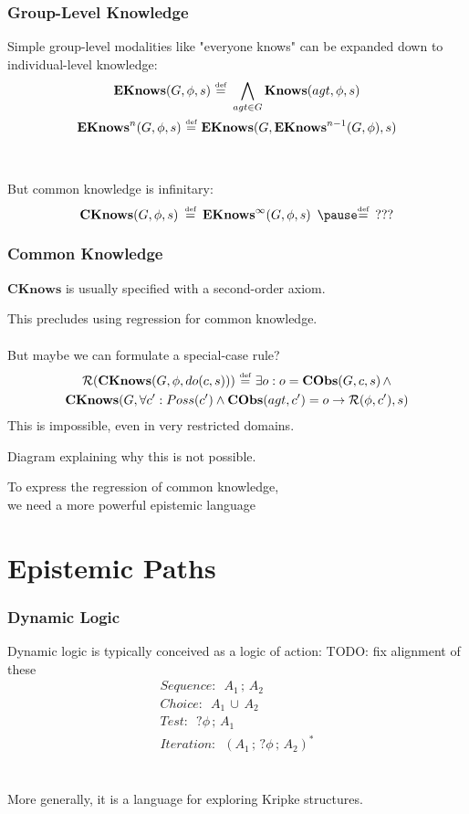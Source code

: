 \documentclass[compress]{beamer}
\newcommand{\isdef}{\hbox{$\stackrel{\mbox{\tiny def}}{=}$}}
\newcommand{\Reg}{\mathcal{R}}
\newcommand{\EKnows}{\mathbf{EKnows}}
\newcommand{\Knows}{\mathbf{Knows}}
\newcommand{\CKnows}{\mathbf{CKnows}}
\begin{document}
\begin{frame}
\frametitle{Group-Level Knowledge}
Simple group-level modalities like "everyone knows" can be expanded down to individual-level knowledge:
\begin{gather*}
\EKnows(G,\phi,s)\,\,\isdef\,\,\bigwedge_{agt \in G} \Knows(agt,\phi,s)\\
\EKnows^{n}(G,\phi,s)\,\,\isdef\,\,\EKnows(G,\EKnows^{n-1}(G,\phi),s)
\end{gather*}
\ \\
\ \\
\pause
But common knowledge is infinitary:
\begin{equation*}
\CKnows(G,\phi,s)\,\,\,\isdef\,\,\,\EKnows^{\infty}(G,\phi,s)\,\,\,\pause \isdef\,\,\,???
\end{equation*}
\end{frame}

\begin{frame}
\frametitle{Common Knowledge}
$\CKnows$ is usually specified with a second-order axiom.

This precludes using regression for common knowledge.
\ \\
\ \\
\pause
But maybe we can formulate a special-case rule?
\begin{multline*}
\Reg(\CKnows(G,\phi,do(c,s)))\,\,\isdef\,\,\exists o: o = \mathbf{CObs}(G,c,s)\,\wedge \\
  \CKnows(G,\forall c': Poss(c')\wedge \mathbf{CObs}(agt,c')=o \rightarrow \Reg(\phi,c'),s)
\end{multline*}
\pause
This is \alert{impossible}, even in very restricted domains.
\end{frame}

\begin{frame}
Diagram explaining why this is not possible.
\end{frame}

\begin{frame}
\centering To express the regression of common knowledge,\\
we need a more powerful epistemic language \\
\end{frame}

\section{Epistemic Paths}

\begin{frame}
\frametitle{Dynamic Logic}
Dynamic logic is typically conceived as a logic of action:
TODO: fix alignment of these
\begin{gather*}
Sequence: \,\,\, A_1\,;\,A_2 \\
Choice: \,\,\, A_1\,\cup\,A_2 \\
Test: \,\,\, ?\phi\,;\,A_1 \\
Iteration: \,\,\, (A_1\,;\,?\phi\,;\,A_2)^*
\end{gather*}
\ \\
\ \\
\pause
More generally, it is a language for exploring Kripke structures.
\end{frame}
\end{document}

